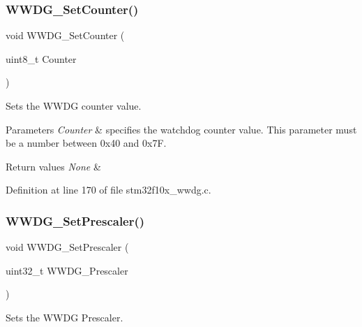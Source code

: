 \subsubsection{\texorpdfstring{W\+W\+D\+G\+\_\+\+Set\+Counter()}{WWDG\_SetCounter()}}
{\footnotesize\ttfamily void W\+W\+D\+G\+\_\+\+Set\+Counter (\begin{DoxyParamCaption}\item[{uint8\+\_\+t}]{Counter }\end{DoxyParamCaption})}



Sets the W\+W\+DG counter value. 


\begin{DoxyParams}{Parameters}
{\em Counter} & specifies the watchdog counter value. This parameter must be a number between 0x40 and 0x7F. \\
\hline
\end{DoxyParams}

\begin{DoxyRetVals}{Return values}
{\em None} & \\
\hline
\end{DoxyRetVals}


Definition at line 170 of file stm32f10x\+\_\+wwdg.\+c.

\mbox{\label{group___w_w_d_g___exported___functions_gafeaa2b52c31ba7baca7eb61d2d42e07b}} 
\subsubsection{\texorpdfstring{W\+W\+D\+G\+\_\+\+Set\+Prescaler()}{WWDG\_SetPrescaler()}}
{\footnotesize\ttfamily void W\+W\+D\+G\+\_\+\+Set\+Prescaler (\begin{DoxyParamCaption}\item[{uint32\+\_\+t}]{W\+W\+D\+G\+\_\+\+Prescaler }\end{DoxyParamCaption})}



Sets the W\+W\+DG Prescaler. 


